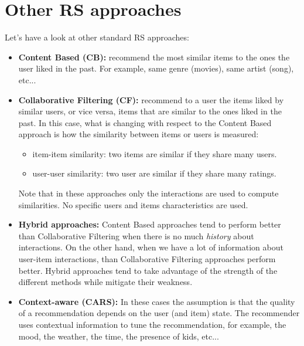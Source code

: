 \section{Other RS approaches}
Let's have a look at other standard RS approaches:
\begin{itemize}
    \item \textbf{Content Based (CB):} recommend the most similar items to the ones the user liked in the past. For example, same genre (movies), same artist (song), etc...
    \item \textbf{Collaborative Filtering (CF):} recommend to a user the items liked by similar users, or vice versa, items that are similar to the ones liked in the past. In this case, what is changing with respect to the Content Based approach is how the similarity between items or users is measured:
    \begin{itemize}
        \item item-item similarity: two items are similar if they share many users.
        \item user-user similarity: two user are similar if they share many ratings.
    \end{itemize}
    Note that in these approaches only the interactions are used to compute similarities. No specific users and items characteristics are used.
    \item \textbf{Hybrid approaches:} Content Based approaches tend to perform better than Collaborative Filtering when there is no much \textit{history} about interactions. On the other hand, when we have a lot of information about user-item interactions, than Collaborative Filtering approaches perform better. Hybrid approaches tend to take advantage of the strength of the different methods while mitigate their weakness.
    \item \textbf{Context-aware (CARS):} In these cases the assumption is that the quality of a recommendation depends on the user (and item) state. The recommender uses contextual information to tune the recommendation, for example, the mood, the weather, the time, the presence of kids, etc...
\end{itemize}


